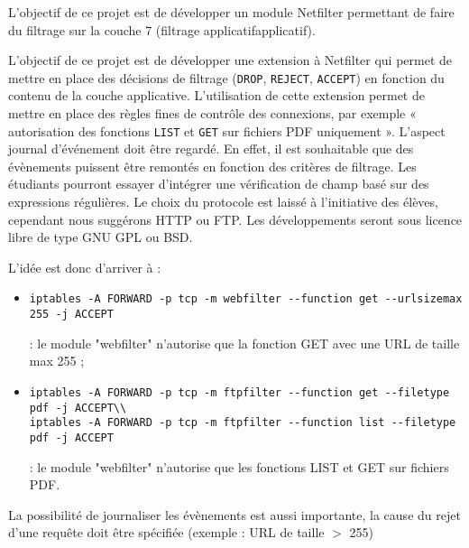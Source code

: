 L'objectif de ce projet est de développer un module Netfilter permettant de faire du filtrage sur la couche 7 (filtrage applicatifapplicatif).

L'objectif de ce projet est de développer une extension à Netfilter qui permet de mettre en place des décisions de filtrage (\verb+DROP+, \verb+REJECT+, \verb+ACCEPT+) en fonction du contenu de la couche applicative. L’utilisation de cette extension permet de mettre en place des règles fines de contrôle des connexions, par exemple « autorisation des fonctions \verb+LIST+ et \verb+GET+ sur fichiers PDF uniquement ». L’aspect journal d’événement doit être regardé. En effet, il est souhaitable que des évènements puissent être remontés en fonction des critères de filtrage. Les étudiants pourront essayer d’intégrer une vérification de champ basé sur des expressions régulières.
Le choix du protocole est laissé à l’initiative des élèves, cependant nous suggérons HTTP ou FTP.
Les développements seront sous licence libre de type GNU GPL ou BSD.

L'idée est donc d'arriver à :
\begin{itemize}
\item \begin{verbatim}iptables -A FORWARD -p tcp -m webfilter --function get --urlsizemax 255 -j ACCEPT\end{verbatim} : le module "webfilter" n'autorise que la fonction GET avec une URL de taille max 255 ;
\item \begin{verbatim}iptables -A FORWARD -p tcp -m ftpfilter --function get --filetype pdf -j ACCEPT\\
iptables -A FORWARD -p tcp -m ftpfilter --function list --filetype pdf -j ACCEPT\end{verbatim} : le module "webfilter" n'autorise que les fonctions LIST et GET sur fichiers PDF.
\end{itemize}

La possibilité de journaliser les évènements est aussi importante, la cause du rejet d'une requête doit être spécifiée (exemple : URL de taille $>$ 255) 